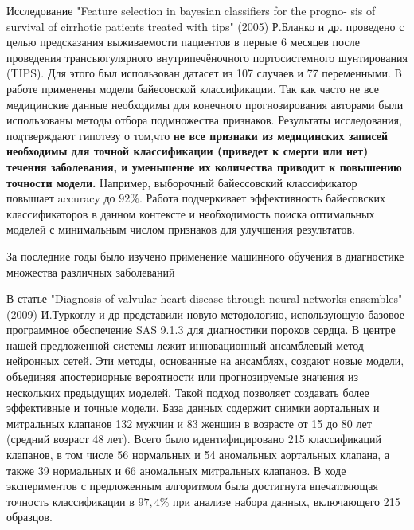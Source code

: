 \documentclass[14pt, a4paper]{extarticle}
\begin{document}
Исследование "Feature selection in bayesian classifiers for the 
progno-
sis
of survival of cirrhotic patients treated with tips" (2005) Р.Бланко и др. \cite{blanco2005feature} проведено с целью предсказания выживаемости пациентов в первые 6 месяцев после проведения трансъюгулярного внутрипечёночного портосистемного шунтирования (TIPS). Для этого был использован датасет из  107 случаев и 77 переменными. В работе применены модели байесовской классификации. Так как часто не все медицинские данные необходимы для конечного прогнозирования авторами были использованы методы отбора подмножества признаков. 
Результаты исследования, подтверждают гипотезу о том,что \textbf{не все признаки из медицинских записей необходимы для точной классификации (приведет к смерти или нет) течения заболевания, и уменьшение их количества приводит к повышению точности модели.} Например, выборочный байессовский классификатор повышает accuracy до $92\%$. Работа подчеркивает эффективность байесовских классификаторов в данном контексте и необходимость поиска оптимальных моделей с минимальным числом признаков для улучшения результатов.

За последние годы  было изучено применение машинного обучения в диагностике множества различных заболеваний

В  статье "Diagnosis
of valvular heart disease through neural networks ensembles" (2009) И.Туркоглу и др \cite{das2009diagnosis} представили новую методологию, использующую базовое программное обеспечение SAS 9.1.3 для диагностики пороков сердца. В центре нашей предложенной системы лежит инновационный ансамблевый метод нейронных сетей. Эти методы, основанные на ансамблях, создают новые модели, объединяя апостериорные вероятности или прогнозируемые значения из нескольких предыдущих моделей. Такой подход позволяет создавать более эффективные и точные модели. База данных содержит снимки аортальных и митральных клапанов 132 мужчин и 83 женщин в возрасте от 15 до 80 лет (средний возраст 48 лет). Всего было идентифицировано 215 классификаций клапанов, в том числе 56 нормальных и 54 аномальных аортальных клапана, а также 39 нормальных и 66 аномальных митральных клапанов.  
В ходе экспериментов с предложенным алгоритмом была достигнута впечатляющая точность классификации в $97,4\%$ при анализе набора данных, включающего 215 образцов.
\end{document}
